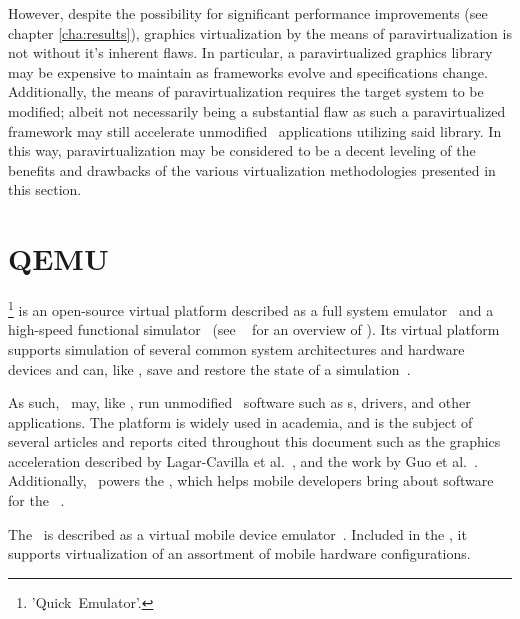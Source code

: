 However, despite the possibility for significant performance improvements (see chapter \ref{cha:results}), graphics virtualization by the means of paravirtualization is not without it's inherent flaws.
In particular, a paravirtualized graphics library may be expensive to maintain as frameworks evolve and specifications change.
Additionally, the means of paravirtualization requires the target system to be modified; albeit not necessarily being a substantial flaw as such a paravirtualized framework may still accelerate unmodified \dvttermtarget\ applications utilizing said library.
In this way, paravirtualization may be considered to be a decent leveling of the benefits and drawbacks of the various virtualization methodologies presented in this section.


\section{QEMU}
\label{sec:backgroundandrelatedwork_qemu}
\dvttermqemu \footnote{'Quick~Emulator'.} is an open-source virtual platform described as a full system emulator~ and a high-speed functional simulator~ (see ~ for an overview of \dvttermqemu ).
Its virtual platform supports simulation of several common system architectures and hardware devices and can, like \dvttermsimics , save and restore the state of a simulation~.

As such, \dvttermqemu\ may, like \dvttermsimics , run unmodified \dvttermtarget\ software such as \dvttermos s, drivers, and other applications.
The platform is widely used in academia, and is the subject of several articles and reports cited throughout this document such as the graphics acceleration described by Lagar-Cavilla et al.~, and the work by Guo et al.~.
Additionally, \dvttermqemu\ powers the \dvttermandroidemulator , which helps mobile developers bring about software for the \dvttermandroid\ \dvttermos .

The \dvttermandroidemulator\ is described as a virtual mobile device emulator~.
Included in the \dvttermandroidsdk , it supports virtualization of an assortment of mobile hardware configurations.


